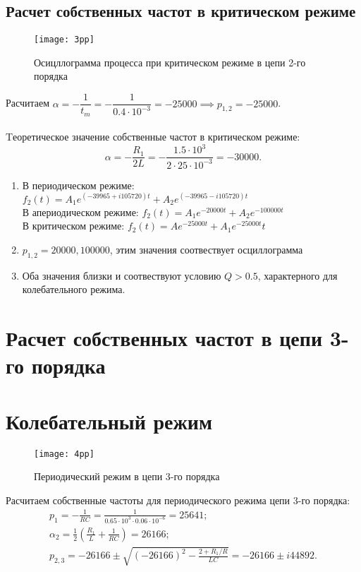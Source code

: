 \documentclass[a4paper,14pt ]{article} %
\begin{document}
\subsection{Расчет собственных частот в критическом режиме}
\begin{figure}[H]
    \texttt{[image: 3pp]}
    \centering
    \caption{Осицллограмма процесса при критическом режиме в цепи 2-го порядка}
\end{figure}
Расчитаем $\alpha = -\dfrac1{t_m} = -\dfrac1{0.4\cdot10^{-3}}= -25000 \implies p_{1,2} = -25000$. 
\\\\ \indent Tеоретическое значение собственные частот в критическом режиме:
\begin{equation*}
    \alpha = -\frac{R_1}{2L} = -\frac{1.5\cdot10^3}{2\cdot25\cdot10^{-3}} = -30000.
\end{equation*}
\begin{enumerate}
    \item В периодическом режиме: $f_2(t) = A_1e^{(-39965 + i105720)t} + A_2e^{(-39965 - i105720)t}$
    \\В апериодическом режиме: $f_2(t) = A_1e^{-20000t} + A_2e^{-100000t}$
    \\В критическом режиме: $f_2(t) = Ae^{-25000t} + A_1e^{-25000t}t$
    \item $p_{1,2} = 20000, 100000$, этим значения соотвествует осциллограмма
    \item Оба значения близки и соотвествуют условию $Q > 0.5$, характерного для колебательного режима.
 \end{enumerate}    
\section{Расчет собственных частот в цепи 3-го порядка}
\section{Колебательный режим} 
\begin{figure}[H]
    \texttt{[image: 4pp]}
    \centering
    \caption{Периодический режим в цепи 3-го порядка}
\end{figure}
Расчитаем собственные частоты для периодического режима цепи 3-го порядка:
\begin{multline*}
    p_1 = -\frac{1}{RC} = \frac{1}{0.65\cdot10^3\cdot0.06\cdot10^{-6}} = 25641;
\\ \alpha_2 = \frac12\left(\frac{R_1}L + \frac1{RC}\right) = 26166;
\\ 
p_{2,3} = -26166 \pm \sqrt{(-26166)^2 - \frac{2 + R_1/R}{LC}}= -26166 \pm i44892.
\end{multline*}
\end{document}
